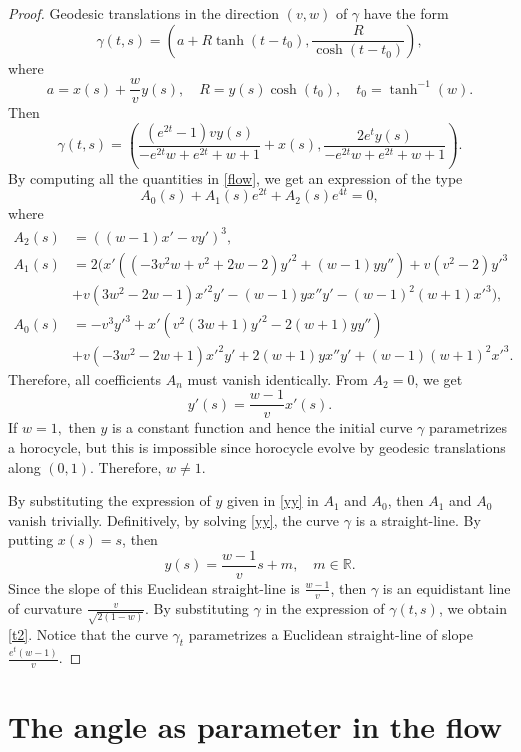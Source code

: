 \documentclass[12pt]{amsart}
\theoremstyle{plain}
\theoremstyle{definition}
\def\r{\mathbb R}
\begin{document}
\begin{proof}
 Geodesic translations in the direction $(v,w)$ of $\gamma$ have   the form $$\gamma(t,s) = (a + R   \tanh(t-t_0), \frac{R}{\cosh(t - t_0)}),$$ where 
$$a  = x(s) + \frac{w}{v}y(s),\quad  R= y(s) \cosh(t_0), \quad  t_0 = \tanh^{-1} (w).$$
Then 
$$\gamma(t,s)=\left(\frac{\left(e^{2 t}-1\right) v y(s)}{-e^{2 t} w+e^{2 t}+w+1}+x(s),\frac{2 e^t y(s)}{-e^{2 t} w+e^{2 t}+w+1}\right).$$
By computing all the quantities in \eqref{flow}, we get an expression of the type
$$A_0(s)+A_1(s)e^{2t}+A_2(s)e^{4t}=0,$$
where
\begin{equation*}
\begin{split}
A_2(s)&=\left((w-1) x'-v y'\right)^3,\\
A_1(s)&=2 \Big(x' \left(\left(-3 v^2 w+v^2+2 w-2\right) y'^2+(w-1) y y''\right)+v \left(v^2-2\right) y'^3\\
&+v \left(3 w^2-2 w-1\right) x'^2 y'-(w-1) y x'' y'-(w-1)^2 (w+1) x'^3\Big),\\
A_0(s)&=-v^3 y'^3+x' \left(v^2 (3 w+1) y'^2-2 (w+1) y y''\right)\\
&+v \left(-3 w^2-2 w+1\right) x'^2 y'+2 (w+1) y x'' y'+(w-1) (w+1)^2 x'^3.
\end{split}
\end{equation*}
Therefore, all coefficients $A_n$ must vanish identically. From $A_2=0$, we get 
\begin{equation}\label{yy}
y'(s)=\frac{w-1}{v}x'(s).
\end{equation}
If $w = 1,$ then $y$ is a constant function and hence the initial curve $\gamma$ parametrizes a horocycle, but this is impossible since horocycle evolve by geodesic translations along $(0,1).$ Therefore, $w \neq 1.$

By substituting the expression of $y$ given in \eqref{yy}  in   $A_1$ and $A_0$, then $A_1$ and $A_0$ vanish trivially.  Definitively, by solving \eqref{yy}, the curve $\gamma$ is a straight-line. By putting $x(s)=s$, then  
$$y(s)=\frac{w-1}{v}s+m,\quad m\in\r.$$
Since the slope of this Euclidean straight-line is $\frac{w-1}{v}$, then $\gamma$  is an equidistant line of curvature $\frac{v}{\sqrt{2(1-w)}}$. By substituting $\gamma$ in the expression of $\gamma(t,s)$, we obtain \eqref{t2}.  Notice that  the curve $\gamma_t$ parametrizes a Euclidean straight-line of slope $\frac{e^t (w-1)}{v}$.


 
\end{proof}
\section{The angle as parameter in the flow}
\label{sec4}
 
\end{document}
